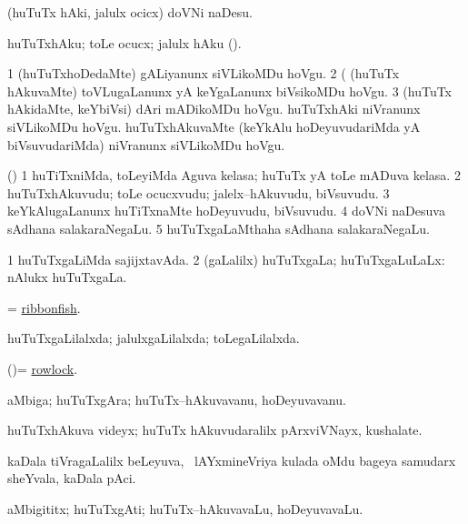 \bentry
{}
\gl{\sakirx}
\bmng
(huTuTx hAki, jalulx ocicx) doVNi naDesu. 
\emng

\noindent
\gl{\akirx}
\bmng
huTuTxhAku; toLe ocucx; jalulx hAku (\kAparx). 
\emng

\noindent
\gl{\pagu}
\bmng
\bnum
\num{1}  (huTuTxhoDedaMte) gALiyanunx siVLikoMDu hoVgu. 
\num{2} (  (huTuTx hAkuvaMte) toVLugaLanunx yA keYgaLanunx biVsikoMDu hoVgu. 
\num{3}  (huTuTx hAkidaMte, keYbiVsi) dAri mADikoMDu hoVgu. 
  
\banum
{} huTuTxhAki niVranunx siVLikoMDu hoVgu. 
 huTuTxhAkuvaMte (keYkAlu hoDeyuvudariMda yA biVsuvudariMda) niVranunx siVLikoMDu hoVgu. 
\eanum
\numie
\enum
\emng
\eentry

\bentry
{}
\gl{\nA}
\bmng
(\kAparx) 
\bnum
\num{1} huTiTxniMda, toLeyiMda Aguva kelasa; huTuTx yA toLe mADuva kelasa. 
\num{2} huTuTxhAkuvudu; toLe ocucxvudu; jalelx--hAkuvudu, biVsuvudu. 
\num{3} keYkAlugaLanunx huTiTxnaMte hoDeyuvudu, biVsuvudu. 
\num{4} doVNi naDesuva sAdhana salakaraNegaLu. 
\num{5} huTuTxgaLaMthaha sAdhana salakaraNegaLu. 
\enum
\emng
\eentry

\bentry
{}
\gl{\gu}
\bmng
\bnum
\num{1} huTuTxgaLiMda sajijxtavAda. 
\num{2} (\saMpa gaLalilx) huTuTxgaLa; huTuTxgaLuLaLx:  nAlukx huTuTxgaLa. 
\enum
\emng
\eentry

\bentry
{}
\gl{\nA}
\bmng
= \hyperref{kandict_r.pdf}{R}{ribbonfish}{ribbonfish}. 
\emng
\eentry

\bentry
{}
\gl{\gu}
\bmng
huTuTxgaLilalxda; jalulxgaLilalxda; toLegaLilalxda. 
\emng
\eentry

\bentry
{}
\gl{\nA}
\bmng
(\ame)= \hyperref{kandict_r.pdf}{R}{rowlock}{rowlock}. 
\emng
\eentry

\bentry
{}
\gl{\nA}
\bmng
aMbiga; huTuTxgAra; huTuTx--hAkuvavanu, hoDeyuvavanu. 
\emng
\eentry

\bentry
{}
\gl{\nA}
\bmng
huTuTxhAkuva videyx; huTuTx hAkuvudaralilx pArxviVNayx, kushalate. 
\emng
\eentry

\bentry
{}
\gl{\nA}
\bmng
kaDala tiVragaLalilx beLeyuva, \kanmu\ lAYxmineVriya kulada oMdu bageya samudarx sheYvala, kaDala pAci. 
\emng
\eentry

\bentry
{}
\gl{\nA}
\bmng
aMbigititx; huTuTxgAti; huTuTx--hAkuvavaLu, hoDeyuvavaLu. 
\emng
\eentry

